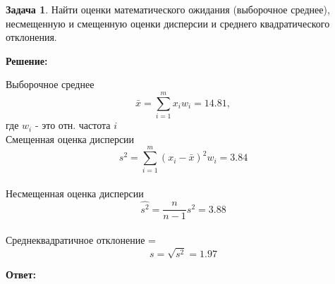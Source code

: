 \documentclass[a4paper,11pt]{article}
\theoremstyle{definition}
\newtheorem{problem}{Задача}\setlength{\parindent}{0pt}
\newenvironment{solution}
{\begin{shaded}\textbf{Решение:}\par\setlength{\parindent}{0pt}}
{\end{shaded}}
\newenvironment{answer}
{\par\noindent\textbf{Ответ:} }
{\par}
\begin{document}
\vspace{8pt}
\begin{problem}
    Найти оценки математического ожидания (выборочное среднее), несмещенную и
    смещенную оценки дисперсии и среднего квадратического отклонения.
    
        \begin{solution}
            Выборочное среднее 
            \[ \bar{x} = \sum^m_{i=1} x_i w_i = 14.81,\] 
            где \(w_i\) - это отн. частота \(i\) \\

            Смещенная оценка дисперсии 
            \[ s^2 = \sum^m_{i=1}(x_i - \bar{x})^2 w_i = 3.84 \] \\

            Несмещенная оценка дисперсии 
            \[ \hat{s^2} = \frac{n}{n-1} s^2 = 3.88 \] \\

            Среднеквадратичное отклонение = \[ s = \sqrt{s^2} = 1.97 \]
        \end{solution}
    
        \begin{answer}
        \end{answer}
    
    \end{problem}
\end{document}
